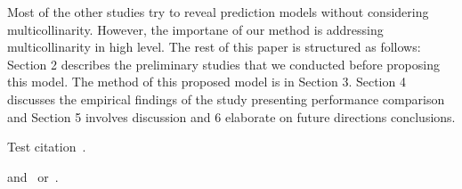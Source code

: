 Most of the other studies try to reveal prediction models without considering multicollinarity. 
However, the importane of our method is addressing multicollinarity in high level.
{}
The rest of this paper is structured as follows:
Section 2 describes the preliminary studies that we conducted before proposing this model.
The method of this proposed model is in Section 3.
Section 4 discusses the empirical findings of the study presenting performance comparison
and Section 5 involves discussion and 6 elaborate on future directions conclusions.





Test citation~\cite{BL12J01}. 
\begin{JournalOnly}
and~\citep{BJL11J01} or~\citet{BJL11J01}.
\end{JournalOnly}







